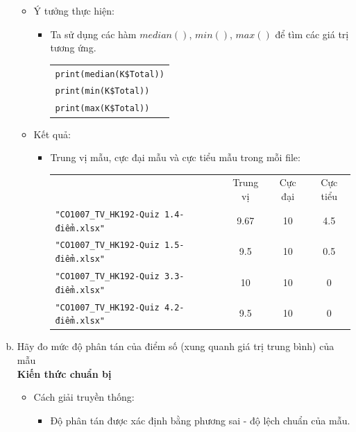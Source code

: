 \documentclass[a4paper]{article}
\theoremstyle{definition}
\begin{document}
\begin{enumerate}[a)]
\begin{itemize}
        \item Ý tưởng thực hiện:
        \begin{itemize}
            \item Ta sử dụng các hàm $median()$, $min()$, $max()$ để tìm các giá trị tương ứng.
            \begin{center}
                \begin{tabular}{p{13cm}}
                    \texttt{print(median(K\$Total))} \\
                    \texttt{print(min(K\$Total))} \\
                    \texttt{print(max(K\$Total))}
                \end{tabular}
            \end{center}
        \end{itemize}
        \item Kết quả:
        \begin{itemize}
            \item Trung vị mẫu, cực đại mẫu và cực tiểu mẫu trong mỗi file:
            \begin{center}
                \begin{tabular}{l c c c}
                     & Trung vị & Cực đại & Cực tiểu\\
                     \texttt{"CO1007\_TV\_HK192-Quiz 1.4-điểm.xlsx"} & 9.67 & 10 & 4.5\\
                     \texttt{"CO1007\_TV\_HK192-Quiz 1.5-điểm.xlsx"} & 9.5 & 10 & 0.5\\
                     \texttt{"CO1007\_TV\_HK192-Quiz 3.3-điểm.xlsx"} & 10 & 10 & 0\\
                     \texttt{"CO1007\_TV\_HK192-Quiz 4.2-điểm.xlsx"} & 9.5 & 10 & 0
                \end{tabular}
            \end{center}
        \end{itemize}
    \end{itemize}
    \bf\item Hãy đo mức độ phân tán của điểm số (xung quanh giá trị trung bình) của  mẫu\\[6pt]
    \bf Kiến thức chuẩn bị\normalfont
    \begin{itemize}
        \item Cách giải truyền thống:
        \begin{itemize}
            \item Độ phân tán được xác định bằng phương sai - độ lệch chuẩn của mẫu.

\end{itemize}
\end{itemize}
\end{enumerate}
\end{document}
